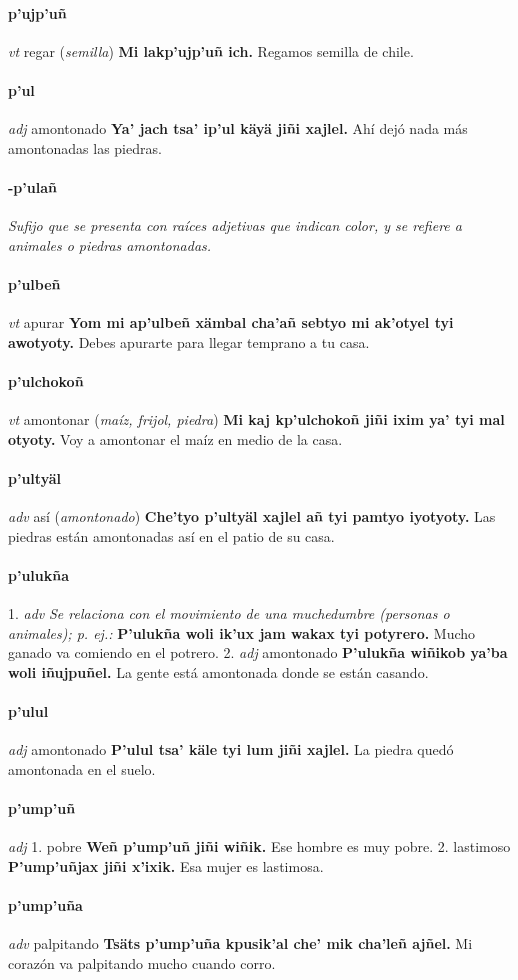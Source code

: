 \documentclass{scrbook}
\newcommand{\entry}[1]{\paragraph{#1}}
\newcommand{\onedefinition}[1]{#1.}
\newcommand{\nontranslationdef}[1]{\textit{#1}}
\newcommand{\partofspeech}[1]{\textit{#1}}
\newcommand{\spanishtranslation}[1]{#1}
\newcommand{\clarification}[1]{(\textit{#1})}
\newcommand{\cholexample}[1]{\textbf{#1}}
\newcommand{\exampletranslation}[1]{#1}
\begin{document}
\begin{multicols}{2}
\entry{p'ujp'uñ}
\partofspeech{vt}
\spanishtranslation{regar}
\clarification{semilla}
\cholexample{Mi lakp'ujp'uñ ich.}
\exampletranslation{Regamos semilla de chile.}

\entry{p'ul}
\partofspeech{adj}
\spanishtranslation{amontonado}
\cholexample{Ya' jach tsa' ip'ul käyä jiñi xajlel.}
\exampletranslation{Ahí dejó nada más amontonadas las piedras.}

\entry{-p'ulañ}
\nontranslationdef{Sufijo que se presenta con raíces adjetivas que indican color, y se refiere a animales o piedras amontonadas.}

\entry{p'ulbeñ}
\partofspeech{vt}
\spanishtranslation{apurar}
\cholexample{Yom mi ap'ulbeñ xämbal cha'añ sebtyo mi ak'otyel tyi awotyoty.}
\exampletranslation{Debes apurarte para llegar temprano a tu casa.}

\entry{p'ulchokoñ}
\partofspeech{vt}
\spanishtranslation{amontonar}
\clarification{maíz, frijol, piedra}
\cholexample{Mi kaj kp'ulchokoñ jiñi ixim ya' tyi mal otyoty.}
\exampletranslation{Voy a amontonar el maíz en medio de la casa.}

\entry{p'ultyäl}
\partofspeech{adv}
\spanishtranslation{así}
\clarification{amontonado}
\cholexample{Che'tyo p'ultyäl xajlel añ tyi pamtyo iyotyoty.}
\exampletranslation{Las piedras están amontonadas así en el patio de su casa.}

\entry{p'ulukña}
\onedefinition{1}
\partofspeech{adv}
\nontranslationdef{Se relaciona con el movimiento de una muchedumbre (personas o animales); p. ej.:}
\cholexample{P'ulukña woli ik'ux jam wakax tyi potyrero.}
\exampletranslation{Mucho ganado va comiendo en el potrero.}
\onedefinition{2}
\partofspeech{adj}
\spanishtranslation{amontonado}
\cholexample{P'ulukña wiñikob ya'ba woli iñujpuñel.}
\exampletranslation{La gente está amontonada donde se están casando.}

\entry{p'ulul}
\partofspeech{adj}
\spanishtranslation{amontonado}
\cholexample{P'ulul tsa' käle tyi lum jiñi xajlel.}
\exampletranslation{La piedra quedó amontonada en el suelo.}

\entry{p'ump'uñ}
\partofspeech{adj}
\onedefinition{1}
\spanishtranslation{pobre}
\cholexample{Weñ p'ump'uñ jiñi wiñik.}
\exampletranslation{Ese hombre es muy pobre.}
\onedefinition{2}
\spanishtranslation{lastimoso}
\cholexample{P'ump'uñjax jiñi x'ixik.}
\exampletranslation{Esa mujer es lastimosa.}

\entry{p'ump'uña}
\partofspeech{adv}
\spanishtranslation{palpitando}
\cholexample{Tsäts p'ump'uña kpusik'al che' mik cha'leñ ajñel.}
\exampletranslation{Mi corazón va palpitando mucho cuando corro.}


\end{multicols}
\end{document}
